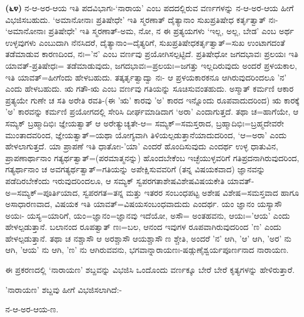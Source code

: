 \textbf{(೬೪)} ನ-ಆ-ಅರ-ಆಯ ಇತಿ ಪದವಿಭಾಗಃ-`ನಾರಾಯ' ಎಂಬ ಪದದಲ್ಲಿರುವ ವರ್ಣಗಳನ್ನು ನ-ಆ-ಅರ-ಆಯ ಹೀಗೆ ವಿಭಜಿಸಬಹುದು. `ಅಮಾನೋನಾಃ ಪ್ರತಿಷೇಧೇ' ಇತಿ ಸ್ಮರಣಾತ್ ದೈತ್ಯಾನಾಂ ಸುಖಪ್ರತಿಷೇಧ ಕರ್ತೃತ್ವಾತ್ ನಃ- `ಅಮಾನೋನಾಃ ಪ್ರತಿಷೇಧೇ' ಇತಿ ಸ್ಮರಣಾತ್-ಅಮ, ನೋ, ನ ಈ ಪ್ರತ್ಯಯಗಳು `ಇಲ್ಲ, ಅಲ್ಲ, ಬೇಡ' ಎಂಬ ಅರ್ಥ ಉಳ್ಳವುಗಳು ಎಂಬುದಾಗಿ ನೆನಸಿದರೆ, ದೈತ್ಯಾನಾಂ=ದೈತ್ಯರಿಗೆ, ಸುಖಪ್ರತಿಷೇಧಕರ್ತೃತ್ವಾತ್=ಸುಖ ಉಂಟಾಗದಂತೆ ತಡೆಮಾಡುವ ಕಾರಣದಿಂದ, ನಃ='ನ' ಎಂಬ ವರ್ಣವು ಪ್ರಯೋಗಿಸಲ್ಪಟ್ಟಿದೆ. ಪ್ರತಿಷೇಧೋ ಜಗದಭಾವಃ ಪ್ರಲಯಃ ಇತಿ ಯಾವತ್-ಪ್ರತಿಷೇಧಃ= ತಡೆಮಾಡುವುದು, ಜಗದಭಾವಃ=ಪ್ರಲಯಃ=ಜಗತ್ತು ಇಲ್ಲದಿರುವುದು ಅಂದರೆ ಪ್ರಳಯಕಾಲ, ಇತಿ ಯಾವತ್=ಹೀಗೆಂದು ಹೇಳಬಹುದು. ತತ್ಕರ್ತೃತ್ವಾದ್ವಾ ನಃ- ಆ ಪ್ರಳಯಕಾರಕನೂ ಆಗಿರುವುದರಿಂದಲೂ 'ನ' ಎಂದು ಹೇಳಬಹುದು. ಋ ಗತೌ-ಋ ಎಂಬ ವರ್ಣವು ಗತಿಯನ್ನು ಸೂಚಿಸುವಂತಹುದು. ಅಸ್ಮಾತ್ ಕರ್ಮಣಿ ಆಕಾರ ಪ್ರತ್ಯಯೇ ಗುಣೇ ಚ ಸತಿ ಅರೇತಿ ರವತಿ-(ಈ 'ಋ' ಕಾರವು 'ಅ' ಕಾರದ ಇನ್ನೊಂದು ರೂಪವಾದುದರಿಂದ) ಋ ಕಾರಕ್ಕೆ 'ಅ' ಕಾರವನ್ನು ಕರ್ಮಣಿ ಪ್ರಯೋಗದಲ್ಲಿ ಸೇರಿಸಿ ದೀರ್ಘಮಾಡಿದಾಗ `ಅರಾ' ಎಂದಾಗುತ್ತದೆ. ತಥಾ ಚ=ಹಾಗೆಯೇ, ಆ ಸಮ್ಯಕ್ ಬ್ರಹ್ಮಾದಿಭಿಃ ಜ್ಞೇಯತ್ವಾತ್ ಆ ಅರೇತ್ಯುಚ್ಯತೇ-ಆ= ಸಮ್ಯಕ್=ಸಮಸ್ತರಾದ, ಬ್ರಹ್ಮಾದಿಭಿಃ=ಬ್ರಹ್ಮದೇವರೇ ಮುಂತಾದವರಿಂದ, ಜ್ಞೇಯತ್ವಾತ್=ಯಥಾ ಯೋಗ್ಯವಾಗಿ ತಿಳಿಯಲ್ಪಡುತ್ತಾನೆಯಾದುದರಿಂದ, `ಆ=ಅರಾ' ಎಂದು ಹೇಳಲಾಗುತ್ತದೆ. ಯಾ ಪ್ರಾಪಣೆ ಇತಿ ಧಾತೋಃ-'ಯಾ' ಎಂದರೆ ಹೊಂದಿಸುವುದು ಎಂದರ್ಥ ಉಳ್ಳ ಧಾತುವಿನ, ಪ್ರಾಪಣಾರ್ಥಾನಾಂ ಗತ್ಯರ್ಥತ್ವಾತ್=(ಪರಮಾತ್ಮನನ್ನು) ಹೊಂದಬೇಕೆಂಬ ಇಚ್ಛೆಯುಳ್ಳವರಿಗೆ ಗತಿಪ್ರದನಾಗಿರುವುದರಿಂದ, ಗತ್ಯರ್ಥಾನಾಂ ಚ ಅವಗತ್ಯರ್ಥತ್ವಾತ್=ಗತಿಯನ್ನು ಅಪೇಕ್ಷಿಸುವವರಿಗೆ (ತನ್ನ ವಿಷಯಕವಾದ) ಜ್ಞಾನವನ್ನು ಪಡೆದಿರಬೇಕೆಂದು ಇರುವುದರಿಂದಲೂ, ಆ ಸಮ್ಯಕ್ ಸ್ವಪರಗತಾಶೇಷವಿಶೇಷವಿಷಯಕೇತಿ ಯಾವತ್-ಅ=ಸಮ್ಯಕ್=ಪೂರ್ತಿಯಾದ, ಸ್ವಪರಗತ=ತನ್ನ ಮತ್ತು ಇತರರ ಸಂಬಂಧಪಟ್ಟ ಅಶೇಷ ವಿಶೇಷ=ಸಮಸ್ತವಾದ ಹಾಗೂ ಅಸಾಧಾರಣವಾದ, ವಿಷಯಕ ಇತಿ ಯಾವತ್=ವಿಷಯಸಂಬಂಧವಾದುದು ಎಂದರ್ಥ. ಯಂ ಜ್ಞಾನಂ ಯಸ್ಯಾಸೌ ಅಯಃ- ಯಸ್ಯ=ಯಾರಿಗೆ, ಯಂ=ಜ್ಞಾನಂ=ಜ್ಞಾನವು ಇದೆಯೋ, ಅಸೌ= ಅಂತಹವನು, ಆಯಃ=\-'ಆಯ' ಎಂದು ಹೇಳಲ್ಪಡುತ್ತಾನೆ. ಬಲಾನಂದ ರೂಪತ್ವಾತ್ ಣಃ=ಬಲ, ಆನಂದ ಇವುಗಳ ರೂಪವಾಗಿರುವುದರಿಂದ 'ಣ' ಎಂದು ಹೇಳಲ್ಪಡುತ್ತಾನೆ. ತಥಾ ಚ ನಶ್ಚಾಸೌ ಆ ಅರಶ್ಚಾಸೌ ಆಯಶ್ಚಾಸೌ ಣ ಶ್ಚೇತಿ, ಅಂದರೆ 'ನ' ಆಗಿ, 'ಆ' ಆಗಿ, 'ಅರ' ನು ಆಗಿ, 'ಆಯ' ನು ಆಗಿ, 'ಣ' ನು ಆಗಿರುವವನು, ಭಗವಾನ್ನಾರಾಯಣಃ-ಷಡ್ಗುಣೈಶ್ವರ್ಯಪೂರ್ಣನಾದ ನಾರಾಯಣ.

ಈ ಪ್ರಕರಣದಲ್ಲಿ `ನಾರಾಯಣ' ಶಬ್ದವನ್ನು ವಿಭಜಿಸಿ ಒಂದೊಂದು ವರ್ಣಕ್ಕೂ ಬೇರೆ ಬೇರೆ ಕೃತ್ಯಗಳನ್ನು ಹೇಳಿರುತ್ತಾರೆ.

\newpage

'ನಾರಾಯಣ' ಶಬ್ದವು ಹೀಗೆ ವಿಭಜಿಸಲಾಗಿದೆ:-

ನ-ಆ-ಅರ-ಆಯ-ಣ.

